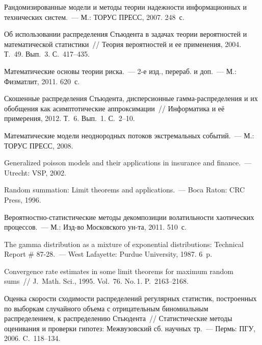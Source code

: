 \begin{multicols}{2}
{\small\frenchspacing
{%
\begin{thebibliography}{99}

Рандомизированные модели и методы тео\-рии на\-деж\-ности информационных и
технических сис\-тем.~--- М.: ТОРУС ПРЕСС, 2007. 248~с.

 Об использовании распределения Стьюдента в
задачах теории вероятностей и математической статистики~// Теория
вероятностей и ее применения, 2004. Т.~49. Вып.~3. С.~417--435.

Математические основы теории риска.~--- 2-е изд.,
перераб. и доп.~--- М.: Физматлит, 2011. 620~с.

 Скошенные распределения Стьюдента,
дисперсионные гам\-ма-рас\-пре\-де\-ле\-ния и их обобщения как асимптотические
аппроксимации~// Информатика и её примерения, 2012. Т.~6. Вып.~1.
С.~2--10.

 Математические модели
неоднородных потоков экстремальных событий.~--- М.: ТОРУС ПРЕСС,
2008.

 Generalized poisson models and their
applications in insurance and finance.~--- Utrecht: VSP, 2002.

 Random summation:
Limit theorems and applications.~--- Boca Raton: CRC Press, 1996.

 Ве\-ро\-ят\-но\-ст\-но-ста\-ти\-сти\-че\-ские методы
декомпозиции волатильности хаотических процессов.~--- М.: Изд-во
Московского ун-та, 2011. 510~с.

 The gamma distribution as a mixture of exponential
distributions: Technical Report \# 87-28.~--- West Lafayette: Purdue
University, 1987. 6~p.

Convergence rate estimates in some limit theorems for
maximum random sums~// J.~Math. Sci., 1995.
Vol.~76. No.\,1. P.~2163--2168.

 Оценка
скорости сходимости распределений регулярных статистик, построенных
по выборкам случайного объема с отрицательным биномиальным
распределением, к распределению Стьюдента~// Статистические методы
оценивания и проверки гипотез: Межвузовский сб. научных тр.~--- 
Пермь: ПГУ, 2006. C.~118--134.


\end{thebibliography}}}
\end{multicols}
